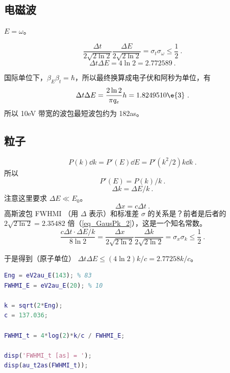 
\subsection{电磁波}
$E = \omega$。

\begin{equation}
\frac{\Delta t}{2\sqrt{2\ln 2}}\frac{\Delta E}{2\sqrt{2\ln 2}} = \sigma_t \sigma_\omega \leq \frac{1}{2}~.
\end{equation}
\begin{equation}
\Delta t\Delta E = 4\ln 2 = 2.772589~.
\end{equation}

国际单位下，$\beta_E\beta_t = \hbar$，所以最终换算成电子伏和阿秒为单位，有
\begin{equation}
\Delta t \Delta E  = \frac{2\ln 2}{\pi q_e}h = 1.8249510\e{3}~.
\end{equation}
所以 10eV 带宽的波包最短波包约为 182as。

\subsection{粒子}
\begin{equation}
P(k)\dd{k} = P'(E)\dd{E} = P'(k^2/2)k\dd{k}~.
\end{equation}
所以
\begin{equation}
P'(E) = P(k)/k~.
\end{equation}
\begin{equation}
\Delta k = \Delta E/k~.
\end{equation}
注意这里要求 $\Delta E \ll E_0$。
\begin{equation}
\Delta x = c\Delta t~.
\end{equation}
高斯波包 FWHMI （用 $\Delta$ 表示）和标准差 $\sigma$ 的关系是？前者是后者的 $2\sqrt{2\ln 2} = 2.35482$ 倍（\autoref{eq_GausPk_2}），这是一个知名常数。
\begin{equation}
\frac{c\Delta t \cdot \Delta E/k}{8\ln 2} = \frac{\Delta x}{2\sqrt{2\ln 2}}\frac{\Delta k}{2\sqrt{2\ln 2}} = \sigma_x \sigma_k \leq \frac{1}{2}~.
\end{equation}

于是得到（原子单位） $\Delta t\Delta E \leq (4\ln 2)k/c = 2.77258 k/c$。

\begin{lstlisting}[language=matlab]
% 以上计算的 Matlab 代码
Eng = eV2au_E(143); % 83
FWHMI_E = eV2au_E(20); % 10

k = sqrt(2*Eng);
c = 137.036;

FWHMI_t = 4*log(2)*k/c / FWHMI_E;

disp('FWHMI_t [as] = ');
disp(au_t2as(FWHMI_t));
\end{lstlisting}
